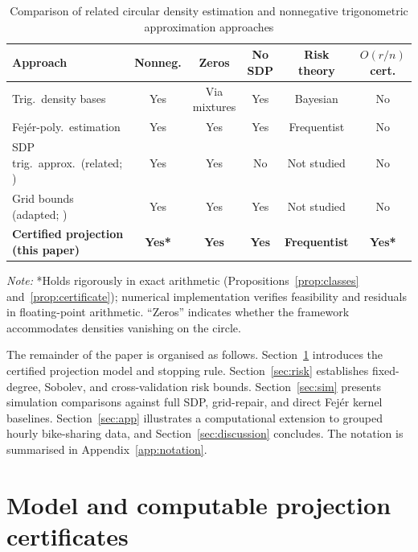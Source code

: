 \begin{table}[htbp]
\centering
\caption{Comparison of related circular density estimation and nonnegative trigonometric approximation approaches}\label{tab:compare}
\footnotesize
\setlength{\tabcolsep}{4pt}
\begin{tabularx}{\textwidth}{>{\raggedright\arraybackslash}Xccccc}
\toprule
Approach & Nonneg. & Zeros & No SDP & Risk theory & \(O(r/n)\) cert. \\
\midrule
Trig.\ density bases \citep{binette2022} & Yes & Via mixtures & Yes & Bayesian & No \\
Fejér-poly.\ estimation \citep{klar2025} & Yes & Yes & Yes & Frequentist & No \\
SDP trig.\ approx.\ (related; \citealp{siem2008}) & Yes & Yes & No & Not studied & No \\
Grid bounds (adapted; \citealp{pfister2019}) & Yes & Yes & Yes & Not studied & No \\
\textbf{Certified projection (this paper)} & \textbf{Yes*} & \textbf{Yes} & \textbf{Yes} & \textbf{Frequentist} & \textbf{Yes*} \\
\bottomrule
\end{tabularx}

\vspace{0.3em}
\footnotesize\textit{Note:} *Holds rigorously in exact arithmetic (Propositions~\ref{prop:classes} and~\ref{prop:certificate}); numerical implementation verifies feasibility and residuals in floating-point arithmetic. ``Zeros'' indicates whether the framework accommodates densities vanishing on the circle.
\end{table}

The remainder of the paper is organised as follows. Section~\ref{sec:model} introduces the certified projection model and stopping rule. Section~\ref{sec:risk} establishes fixed-degree, Sobolev, and cross-validation risk bounds. Section~\ref{sec:sim} presents simulation comparisons against full SDP, grid-repair, and direct Fejér kernel baselines. Section~\ref{sec:app} illustrates a computational extension to grouped hourly bike-sharing data, and Section~\ref{sec:discussion} concludes. The notation is summarised in Appendix~\ref{app:notation}.

\section{Model and computable projection certificates}\label{sec:model}
